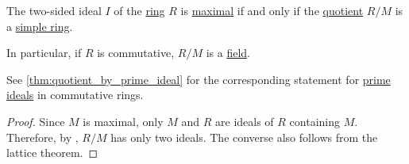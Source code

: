 \begin{corollary}\label{thm:quotient_by_maximal_ideal}
  The two-sided ideal \( I \) of the \hyperref[def:ring]{ring} \( R \) is \hyperref[def:semiring_ideal/maximal]{maximal} if and only if the \hyperref[def:ring/quotient]{quotient} \( R / M \) is a \hyperref[def:ring/simple]{simple ring}.
\end{corollary}
\begin{comments}
  \item In particular, if \( R \) is commutative, \( R / M \) is a \hyperref[def:field]{field}.
\end{comments}
\begin{comments}
  \item See \cref{thm:quotient_by_prime_ideal} for the corresponding statement for \hyperref[def:semiring_ideal/prime]{prime ideals} in commutative rings.
\end{comments}
\begin{proof}
  Since \( M \) is maximal, only \( M \) and \( R \) are ideals of \( R \) containing \( M \). Therefore, by , \( R / M \) has only two ideals. The converse also follows from the lattice theorem.
\end{proof}

